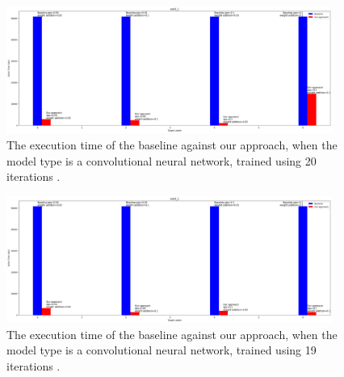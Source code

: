 \begin{figure}[ht]
  \centering
  \includegraphics[width=0.95\textwidth]{cnn0_1.png}
  \caption{The execution time of the baseline against our approach, when the model type is a convolutional neural network, trained using 20 iterations .}
  \label{fig:cnn0_1}
\end{figure}

\begin{figure}[ht]
  \centering
  \includegraphics[width=0.95\textwidth]{cnn0_2.png}
  \caption{The execution time of the baseline against our approach, when the model type is a convolutional neural network, trained using 19 iterations .}
  \label{fig:cnn0_2}
\end{figure}


